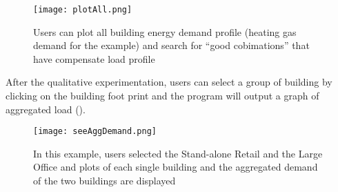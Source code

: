 \begin{enumerate}[1).]
  \begin{figure}[h!]
    \centering
    \texttt{[image: plotAll.png]}
    \caption[See All Demand Plot]{Users can plot all building energy
      demand profile (heating gas demand for the example) and search
      for ``good cobimations'' that have compensate load profile}
    \label{fig:plotAll}
  \end{figure}
  
  After the qualitative experimentation, users can select a group of
  building by clicking on the building foot print and the program will
  output a graph of aggregated load ().

  \begin{figure}[h!]
    \centering
    \texttt{[image: seeAggDemand.png]}
    \caption[Plot Aggregated Demand]{In this example, users selected
      the Stand-alone Retail and the Large Office and plots of each
      single building and the aggregated demand of the two buildings
      are displayed}
    \label{fig:seeAggDemand}
  \end{figure}
  
\end{enumerate}

